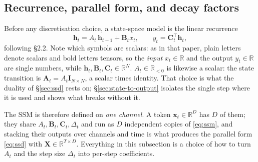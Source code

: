\documentclass[11pt,a4paper]{article}
\begin{document}
\subsection{Recurrence, parallel form, and decay factors}
\label{sec:decay}

Before any discretisation choice, a state-space model is the linear
recurrence
\begin{equation}\label{eq:ssm}
  \bm{h}_t = A_t\,\bm{h}_{t-1} + \bm{B}_t x_t,
  \qquad
  y_t = \bm{C}_t^\top\bm{h}_t,
\end{equation}
following \cite{mamba3} \S2.2. Note which symbols are scalars: as in that
paper, plain letters denote scalars and bold letters tensors, so the
\emph{input} $x_t \in \mathbb{R}$ and the output $y_t \in \mathbb{R}$ are
single numbers, while $\bm{h}_t,\bm{B}_t,\bm{C}_t \in \mathbb{R}^{N}$.
$A_t \in \mathbb{R}_{<0}$ is likewise a scalar: the state transition is
$\bm{A}_t = A_t\bm{I}_{N\times N}$, a scalar times identity. That choice
is what the duality of \S\ref{sec:ssd} rests on;
\S\ref{sec:state-to-output} isolates the single step where it is used and
shows what breaks without it.

The SSM is therefore defined on \emph{one channel}. A token
$\bm{x}_t \in \mathbb{R}^{D}$ has $D$ of them; they share
$A_t,\bm{B}_t,\bm{C}_t,\Delta_t$ and run as $D$ independent copies of
\eqref{eq:ssm}, and stacking their outputs over channels and time is what
produces the parallel form \eqref{eq:ssd} with $\bm{X} \in \mathbb{R}^{T\times D}$. Everything in this subsection is a
choice of how to turn $A_t$ and the step size $\Delta_t$ into per-step
coefficients.
\end{document}
